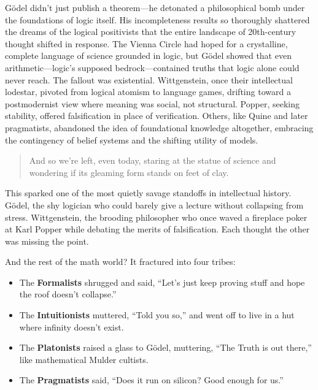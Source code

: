 Gödel didn’t just publish a theorem—he detonated a philosophical bomb under the foundations of logic itself. His incompleteness results so thoroughly shattered the dreams of the logical positivists that the entire landscape of 20th-century thought shifted in response. The Vienna Circle had hoped for a crystalline, complete language of science grounded in logic, but Gödel showed that even arithmetic—logic’s supposed bedrock—contained truths that logic alone could never reach. The fallout was existential. Wittgenstein, once their intellectual lodestar, pivoted from logical atomism to language games, drifting toward a postmodernist view where meaning was social, not structural. Popper, seeking stability, offered falsification in place of verification. Others, like Quine and later pragmatists, abandoned the idea of foundational knowledge altogether, embracing the contingency of belief systems and the shifting utility of models. 

\begin{quote}
And so we’re left, even today, staring at the statue of science and wondering if its gleaming form stands on feet of clay.
\end{quote}


This sparked one of the most quietly savage standoffs in intellectual history. Gödel, the shy logician who could barely give a lecture without collapsing from stress. Wittgenstein, the brooding philosopher who once waved a fireplace poker at Karl Popper while debating the merits of falsification. Each thought the other was missing the point. 

And the rest of the math world? It fractured into four tribes:

\begin{itemize}
    \item The \textbf{Formalists} shrugged and said, “Let’s just keep proving stuff and hope the roof doesn’t collapse.”
    \item The \textbf{Intuitionists} muttered, “Told you so,” and went off to live in a hut where infinity doesn’t exist.
    \item The \textbf{Platonists} raised a glass to Gödel, muttering, “The Truth is out there,” like mathematical Mulder cultists.
    \item The \textbf{Pragmatists} said, “Does it run on silicon? Good enough for us.”
\end{itemize}


\vspace{1em}

